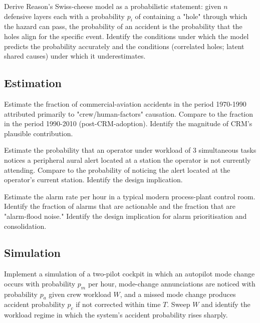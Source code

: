 \begin{exercise}
Derive Reason's Swiss-cheese model as a probabilistic statement: given $n$ defensive layers each with a probability $p_i$ of containing a "hole" through which the hazard can pass, the probability of an accident is the probability that the holes align for the specific event. Identify the conditions under which the model predicts the probability accurately and the conditions (correlated holes; latent shared causes) under which it underestimates.
\end{exercise}

\subsection*{Estimation}

\begin{exercise}
Estimate the fraction of commercial-aviation accidents in the period 1970-1990 attributed primarily to "crew/human-factors" causation. Compare to the fraction in the period 1990-2010 (post-CRM-adoption). Identify the magnitude of CRM's plausible contribution.
\end{exercise}

\begin{exercise}
Estimate the probability that an operator under workload of 3 simultaneous tasks notices a peripheral aural alert located at a station the operator is not currently attending. Compare to the probability of noticing the alert located at the operator's current station. Identify the design implication.
\end{exercise}

\begin{exercise}
Estimate the alarm rate per hour in a typical modern process-plant control room. Identify the fraction of alarms that are actionable and the fraction that are "alarm-flood noise." Identify the design implication for alarm prioritisation and consolidation.
\end{exercise}

\subsection*{Simulation}

\begin{exercise}
Implement a simulation of a two-pilot cockpit in which an autopilot mode change occurs with probability $p_m$ per hour, mode-change annunciations are noticed with probability $p_a$ given crew workload $W$, and a missed mode change produces accident probability $p_c$ if not corrected within time $T$. Sweep $W$ and identify the workload regime in which the system's accident probability rises sharply.
\end{exercise}

